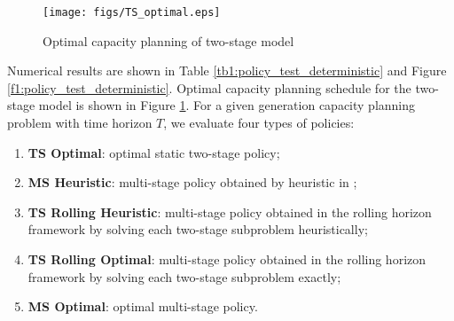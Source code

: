 \documentclass[10pt]{article}
\theoremstyle{plain}
\theoremstyle{definition}
\theoremstyle{remark}
\begin{document}
\begin{figure}[h!]
\begin{center}
\texttt{[image: figs/TS\_optimal.eps]}
\end{center}
\vskip -0.5cm
\caption{Optimal capacity planning of two-stage model}
\label{f2:TS_optimal}
\end{figure}


Numerical results are shown in Table \ref{tb1:policy_test_deterministic}  and Figure \ref{f1:policy_test_deterministic}.
Optimal capacity planning schedule for the two-stage model is shown in Figure \ref{f2:TS_optimal}.
For a given generation capacity planning problem with time horizon $T$, we evaluate four types
of policies:
\begin{enumerate}[label=\emph{\roman*)}]
\item \textbf{TS Optimal}: optimal static two-stage policy;
\item \textbf{MS Heuristic}: multi-stage policy obtained by heuristic in \cite{HA2009};
\item \textbf{TS Rolling Heuristic}: multi-stage policy obtained in the rolling horizon framework by solving each two-stage subproblem heuristically;
\item \textbf{TS Rolling Optimal}: multi-stage policy obtained in the rolling horizon framework by solving each two-stage subproblem exactly;
\item \textbf{MS Optimal}: optimal multi-stage policy.
\end{enumerate}
\end{document}
